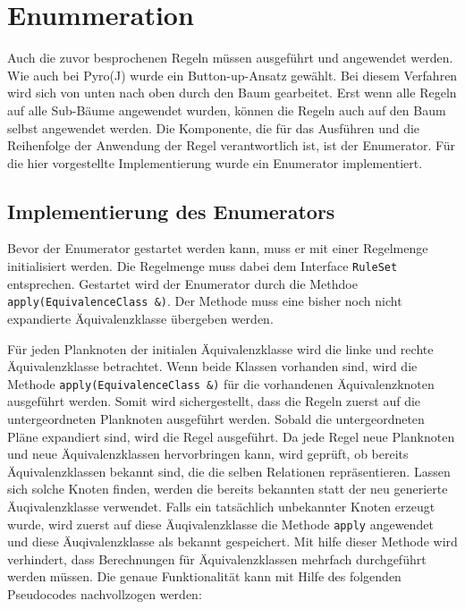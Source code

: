 \section{Enummeration}

Auch die zuvor besprochenen Regeln müssen ausgeführt und angewendet werden. Wie auch bei Pyro(J) wurde ein Button-up-Ansatz gewählt. Bei diesem Verfahren wird sich von unten nach oben durch den Baum gearbeitet. Erst wenn alle Regeln auf alle Sub-Bäume angewendet wurden, können die Regeln auch auf den Baum selbst angewendet werden. Die Komponente, die für das Ausführen und die Reihenfolge der Anwendung der Regel verantwortlich ist, ist der Enumerator. Für die hier vorgestellte Implementierung wurde ein Enumerator implementiert.


\subsection{Implementierung des Enumerators}

Bevor der Enumerator gestartet werden kann, muss er mit einer Regelmenge initialisiert werden. Die Regelmenge muss dabei dem Interface \texttt{RuleSet} entsprechen. Gestartet wird der Enumerator durch die Methdoe \texttt{apply(EquivalenceClass \&)}. Der Methode muss eine bisher noch nicht expandierte Äquivalenzklasse übergeben werden. 

Für jeden Planknoten der initialen Äquivalenzklasse wird die linke und rechte Äquivalenzklasse betrachtet. Wenn beide Klassen vorhanden sind, wird die Methode \texttt{apply(EquivalenceClass \&)} für die vorhandenen Äquivalenzknoten ausgeführt werden. Somit wird sichergestellt, dass die Regeln zuerst auf die untergeordneten Planknoten ausgeführt werden. Sobald die untergeordneten Pläne expandiert sind, wird die Regel ausgeführt. Da jede Regel neue Planknoten und neue Äquivalenzklassen hervorbringen kann, wird geprüft, ob bereits Äquivalenzklassen bekannt sind, die die selben Relationen repräsentieren. Lassen sich solche Knoten finden, werden die bereits bekannten statt der neu generierte Äuqivalenzklasse verwendet. Falls ein tatsächlich unbekannter Knoten erzeugt wurde, wird zuerst auf diese Äuqivalenzklasse die Methode \texttt{apply} angewendet und diese Äuqivalenzklasse als bekannt gespeichert. Mit hilfe dieser Methode wird verhindert, dass Berechnungen für Äquivalenzklassen mehrfach durchgeführt werden müssen. Die genaue Funktionalität kann mit Hilfe des folgenden Pseudocodes nachvollzogen werden:

